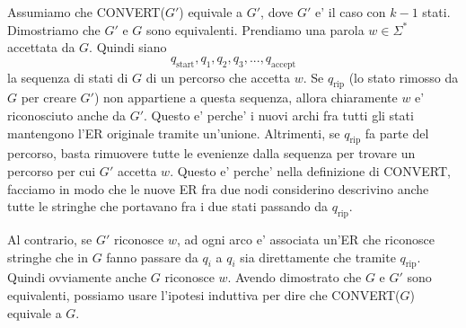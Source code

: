 {\begin{itemize}
      Assumiamo che CONVERT($ G' $) equivale a $ G' $, dove $ G' $ e' il caso con $ k-1 $ stati. Dimostriamo che $ G' $ e $ G $ sono equivalenti. Prendiamo una parola $ w \in \Sigma^* $ accettata da $ G $. Quindi siano
      \[
      q_{\text{start}}, q_1, q_2, q_3, ..., q_{\text{accept}}
      \]
      la sequenza di stati di $ G $ di un percorso che accetta $ w $. Se $ q_{\text{rip}} $ (lo stato rimosso da $ G $ per creare $ G' $) non appartiene a questa sequenza, allora chiaramente $ w $ e' riconosciuto anche da $ G' $. Questo e' perche' i nuovi archi fra tutti gli stati mantengono l'ER originale tramite un'unione. Altrimenti, se $ q_{\text{rip}} $ fa parte del percorso, basta rimuovere tutte le evenienze dalla sequenza per trovare un percorso per cui $ G' $ accetta $ w $. Questo e' perche' nella definizione di CONVERT, facciamo in modo che le nuove ER fra due nodi considerino descrivino anche tutte le stringhe che portavano fra i due stati passando da $ q_{\text{rip}} $. 

      Al contrario, se $ G' $ riconosce $ w $, ad ogni arco e' associata un'ER che riconosce stringhe che in $ G $ fanno passare da $ q_i $ a $ q_i $ sia direttamente che tramite $ q_{\text{rip}} $. Quindi ovviamente anche $ G $ riconosce $ w $. Avendo dimostrato che $ G $ e $ G' $ sono equivalenti, possiamo usare l'ipotesi induttiva per dire che CONVERT($ G $) equivale a $ G $.
  \end{itemize}
}


